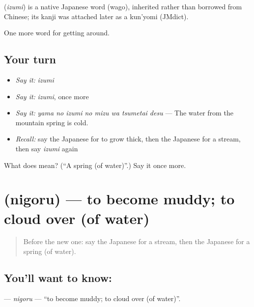 \begin{cousinweb}
\textbf{} (\emph{izumi}) is a native Japanese word (wago), inherited rather than borrowed from Chinese; its kanji was attached later as a kun'yomi (JMdict).
\end{cousinweb}

\begin{grammarlens}[title={What you've built}]
One more word for getting around.
\end{grammarlens}

\subsection*{Your turn}
\begin{itemize}
\raggedright
  \item \emph{Say it:} \emph{izumi}
  \item \emph{Say it:} \emph{izumi}, once more
  \item \emph{Say it:} \emph{yama no izumi no mizu wa tsumetai desu} — The water from the mountain spring is cold.
  \item \emph{Recall:} say the Japanese for to grow thick, then the Japanese for a stream, then say \emph{izumi} again
\end{itemize}

\begin{tcolorbox}[breakable,colback=teal!4,colframe=teal!35!black,title={Before you move on}]
What does  mean? (\textquotedblleft{}A spring (of water)\textquotedblright{}.) Say it once more.
\end{tcolorbox}
\section[\texorpdfstring{\ja{にごる} (nigoru)}{にごる (nigoru)}]{ (nigoru) — to become muddy; to cloud over (of water)}

\label{lesson:JA-C411-nigoru}



\begin{quote}
Before the new one: say the Japanese for a stream, then the Japanese for a spring (of water).
\end{quote}

\subsection*{You'll want to know: }
\textbf{} — \emph{nigoru} — \textquotedblleft{}to become muddy; to cloud over (of water)\textquotedblright{}.

